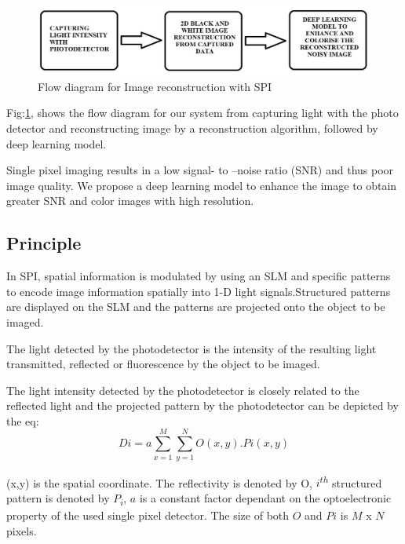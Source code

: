 \documentclass[conference]{IEEEtran}
\begin{document}
\begin{figure}[h]
\includegraphics[scale=0.34]{figures/flow diagram.jpg}
\caption{Flow diagram for Image reconstruction with SPI}
\label{fig:flow_diagram}
\end{figure}

Fig:\ref{fig:flow_diagram}, shows the flow diagram for our system from capturing light with the photo detector and reconstructing image by a reconstruction algorithm, followed by deep learning model.


\par Single pixel imaging results in a low signal- to –noise ratio (SNR) and thus poor image quality. We propose a deep learning model to enhance the image to obtain greater SNR and color images with high resolution.
\subsection{Principle}\label{AA}
In SPI, spatial information is modulated by using an SLM and specific patterns to encode image information spatially into 1-D light signals.Structured patterns are displayed on the SLM and the patterns are projected onto the object to be imaged.\par
The light detected by the photodetector is the intensity of the resulting light transmitted, reflected or fluorescence by the object to be imaged.
\par
The light intensity detected by the photodetector is closely related to the reflected light and the projected pattern by the photodetector can be depicted by the eq: 
\begin{equation}D{i}=a\sum_{x=1}^{M}\sum_{y=1}^{N}O(x,y).P{i}(x,y)\end{equation}
\par
(x,y)  is the spatial coordinate. The reflectivity is denoted by O, $i$\textsuperscript{$th$} structured pattern is denoted by $P$\textsubscript{$i$}, $a$ is a constant factor dependant on the optoelectronic property of the used single pixel detector. The size of both $O$ and $Pi$ is $M$ x $N$ pixels.
\end{document}
